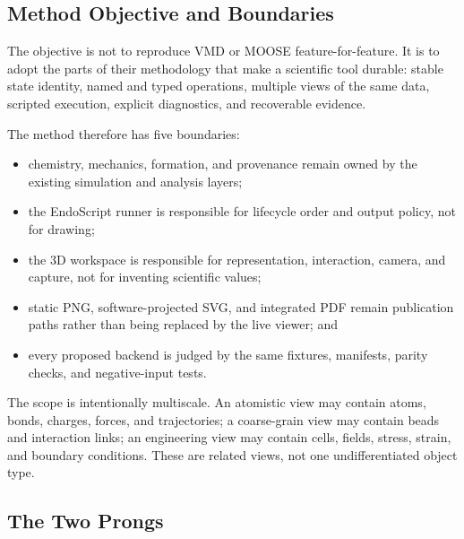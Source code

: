 \documentclass[11pt,a4paper]{article}
\begin{document}
\subsection{Method Objective and Boundaries}

The objective is not to reproduce VMD or MOOSE feature-for-feature.  It is to
adopt the parts of their methodology that make a scientific tool durable:
stable state identity, named and typed operations, multiple views of the same
data, scripted execution, explicit diagnostics, and recoverable evidence.

The method therefore has five boundaries:

\begin{itemize}
  \item chemistry, mechanics, formation, and provenance remain owned by the
        existing simulation and analysis layers;
  \item the EndoScript runner is responsible for lifecycle order and output
        policy, not for drawing;
  \item the 3D workspace is responsible for representation, interaction,
        camera, and capture, not for inventing scientific values;
  \item static PNG, software-projected SVG, and integrated PDF remain
        publication paths rather than being replaced by the live viewer; and
  \item every proposed backend is judged by the same fixtures, manifests,
        parity checks, and negative-input tests.
\end{itemize}

The scope is intentionally multiscale.  An atomistic view may contain atoms,
bonds, charges, forces, and trajectories; a coarse-grain view may contain
beads and interaction links; an engineering view may contain cells, fields,
stress, strain, and boundary conditions.  These are related views, not one
undifferentiated object type.

\subsection{The Two Prongs}
\end{document}
